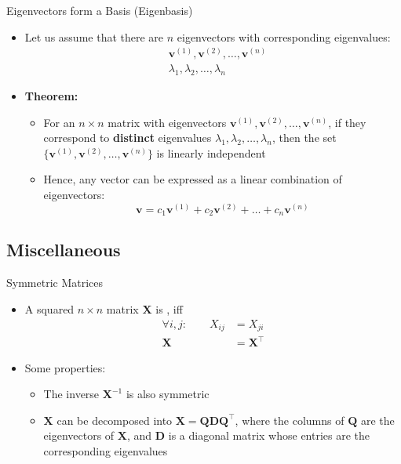 \begin{frame}{Eigenvectors form a Basis (Eigenbasis)}{}
	\begin{itemize}
		\item Let us assume that there are $n$ eigenvectors with corresponding eigenvalues:
		\begin{align*}
			&\bm{v}^{(1)}, \bm{v}^{(2)}, \dots, \bm{v}^{(n)} \\
			&\lambda_1, \lambda_2, \dots, \lambda_n
		\end{align*}
		\item \textbf{Theorem:}
		\begin{itemize}
			\item For an $n \times n$ matrix with eigenvectors $\bm{v}^{(1)}, \bm{v}^{(2)}, \dots, \bm{v}^{(n)}$,
				if they correspond to \textbf{distinct} eigenvalues $\lambda_1, \lambda_2, \dots, \lambda_n$,
				then the set $\{ \bm{v}^{(1)}, \bm{v}^{(2)}, \dots, \bm{v}^{(n)} \}$ is linearly independent
			\item Hence, any vector can be expressed as a linear combination of eigenvectors:
			\begin{equation*}
				\bm{v} = c_1 \bm{v}^{(1)} + c_2 \bm{v}^{(2)} + \dots + c_n \bm{v}^{(n)}
			\end{equation*}
		\end{itemize}
	\end{itemize}
\end{frame}


\subsection{Miscellaneous}

\begin{frame}{Symmetric Matrices}{}
	\begin{itemize}
		\item A squared $n \times n$ matrix $\bm{X}$ is , iff
		\begin{align}
			\forall i, j: \qquad X_{ij}
				&= X_{ji} \\
			\bm{X}
				&= \bm{X}^{\intercal}
		\end{align}
		\item Some properties:
		\begin{itemize}
			\item The inverse $\bm{X}^{-1}$ is also symmetric
			\item {} $\bm{X}$ can be decomposed into $\bm{X} = \bm{Q} \bm{D} \bm{Q}^{\intercal}$,
				where the columns of $\bm{Q}$ are the eigenvectors of $\bm{X}$, and $\bm{D}$ is a diagonal matrix whose
				entries are the corresponding eigenvalues
		\end{itemize}
	\end{itemize}
\end{frame}


